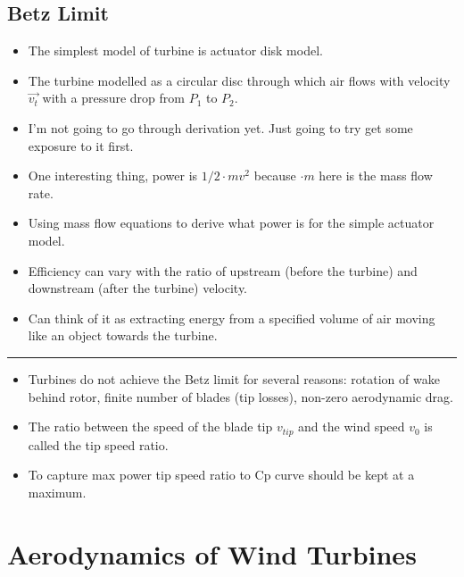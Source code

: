 \documentclass[11pt]{article}
\begin{document}
\hypertarget{betz-limit}{%
\subsection{Betz Limit}\label{betz-limit}}

\begin{itemize}
\tightlist
\item
  The simplest model of turbine is actuator disk model.
\item
  The turbine modelled as a circular disc through which air flows with
  velocity \(\vec{v_t}\) with a pressure drop from \(P_1\) to \(P_2\).
\item
  I'm not going to go through derivation yet. Just going to try get some
  exposure to it first.
\item
  One interesting thing, power is \(1/2\cdot{m}v^2\) because
  \(\cdot{m}\) here is the mass flow rate.
\item
  Using mass flow equations to derive what power is for the simple
  actuator model.
\item
  Efficiency can vary with the ratio of upstream (before the turbine)
  and downstream (after the turbine) velocity.
\item
  Can think of it as extracting energy from a specified volume of air
  moving like an object towards the turbine.
\end{itemize}

\begin{center}\rule{0.5\linewidth}{\linethickness}\end{center}

\begin{itemize}
\tightlist
\item
  Turbines do not achieve the Betz limit for several reasons: rotation
  of wake behind rotor, finite number of blades (tip losses), non-zero
  aerodynamic drag.
\item
  The ratio between the speed of the blade tip \(v_{tip}\) and the wind
  speed \(v_0\) is called the tip speed ratio.
\item
  To capture max power tip speed ratio to Cp curve should be kept at a
  maximum.
\end{itemize}

\hypertarget{aerodynamics-of-wind-turbines}{%
\section{Aerodynamics of Wind
Turbines}\label{aerodynamics-of-wind-turbines}}
\end{document}
